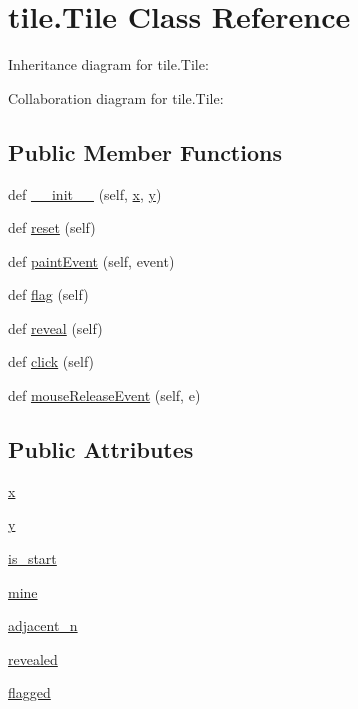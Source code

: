 \hypertarget{classtile_1_1_tile}{}\section{tile.\+Tile Class Reference}
\label{classtile_1_1_tile}


Inheritance diagram for tile.\+Tile\+:


Collaboration diagram for tile.\+Tile\+:
\subsection*{Public Member Functions}
\begin{DoxyCompactItemize}
\item 
def \mbox{\hyperlink{classtile_1_1_tile_a4f02fc7ff22b66bbf6d4660eab79ad8a}{\+\_\+\+\_\+init\+\_\+\+\_\+}} (self, \mbox{\hyperlink{classtile_1_1_tile_a3d5f111dcaf01ba902df52f85ee50318}{x}}, \mbox{\hyperlink{classtile_1_1_tile_aea02ac6a7bbed9aacf20d5db108f3006}{y}})
\item 
def \mbox{\hyperlink{classtile_1_1_tile_aace6248933849675e14c829240fcc4c2}{reset}} (self)
\item 
def \mbox{\hyperlink{classtile_1_1_tile_af14e5b7f51340e91c603bc032c43d8d5}{paint\+Event}} (self, event)
\item 
def \mbox{\hyperlink{classtile_1_1_tile_a54edcdbf94da0c1d8dab7686fdce8a69}{flag}} (self)
\item 
def \mbox{\hyperlink{classtile_1_1_tile_a446f045f44718e6837abae8d0622c8ca}{reveal}} (self)
\item 
def \mbox{\hyperlink{classtile_1_1_tile_a024a479a7f7a0b8b4cc9c77f913bb6e3}{click}} (self)
\item 
def \mbox{\hyperlink{classtile_1_1_tile_a0441823c54ba6bbd8c29d9d61ff8161b}{mouse\+Release\+Event}} (self, e)
\end{DoxyCompactItemize}
\subsection*{Public Attributes}
\begin{DoxyCompactItemize}
\item 
\mbox{\hyperlink{classtile_1_1_tile_a3d5f111dcaf01ba902df52f85ee50318}{x}}
\item 
\mbox{\hyperlink{classtile_1_1_tile_aea02ac6a7bbed9aacf20d5db108f3006}{y}}
\item 
\mbox{\hyperlink{classtile_1_1_tile_ab4f8de0b5af2f9a0b27224d725e8b5a7}{is\+\_\+start}}
\item 
\mbox{\hyperlink{classtile_1_1_tile_ab29c964ec3ffe2e99aa557bb8d3a9982}{mine}}
\item 
\mbox{\hyperlink{classtile_1_1_tile_a5f38c273f7d60000a57a75be5021e111}{adjacent\+\_\+n}}
\item 
\mbox{\hyperlink{classtile_1_1_tile_a5757ce164d1a98a1a001e81d78243356}{revealed}}
\item 
\mbox{\hyperlink{classtile_1_1_tile_aa67ee8ccb2215eae98063593792e341c}{flagged}}
\end{DoxyCompactItemize}

